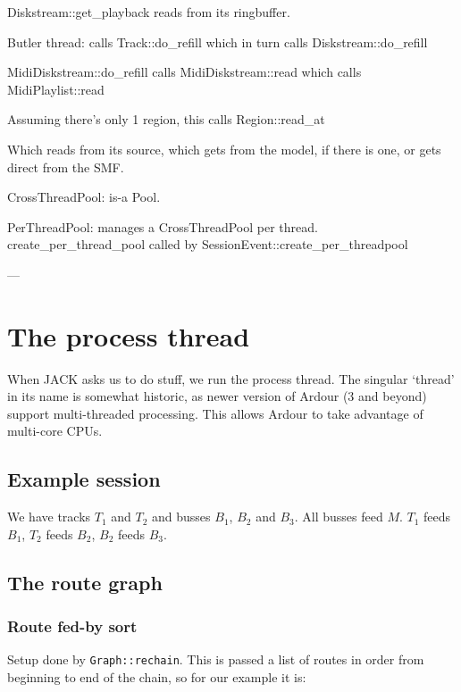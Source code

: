 \documentclass[10pt,a4paper]{book}
\newcommand{\code}[1]{\texttt{#1}}
\begin{document}
Diskstream::get\_playback reads from its ringbuffer.


Butler thread: calls Track::do\_refill which in turn calls Diskstream::do\_refill

MidiDiskstream::do\_refill calls MidiDiskstream::read which calls MidiPlaylist::read

Assuming there's only 1 region, this calls Region::read\_at

Which reads from its source, which gets from the model, if there is one, or gets direct from the SMF.




CrossThreadPool: is-a Pool.

PerThreadPool: manages a CrossThreadPool per thread.  create\_per\_thread\_pool
called by SessionEvent::create\_per\_thread\-pool

---



\chapter{The process thread}

When JACK asks us to do stuff, we run the process thread.  The
singular `thread' in its name is somewhat historic, as newer version
of Ardour (3 and beyond) support multi-threaded processing.  This
allows Ardour to take advantage of multi-core CPUs.

\section{Example session}

We have tracks $T_1$ and $T_2$ and busses $B_1$, $B_2$ and $B_3$.  All
busses feed $M$.  $T_1$ feeds $B_1$, $T_2$ feeds $B_2$, $B_2$ feeds
$B_3$.


\section{The route graph}

\subsection{Route fed-by sort}

Setup done by \code{Graph::rechain}.  This is passed a list of routes
in order from beginning to end of the chain, so for our example it is:
\end{document}
